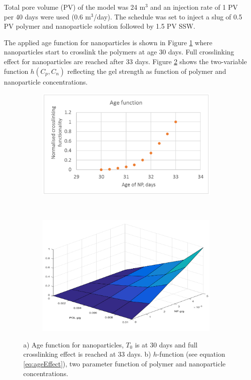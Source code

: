 \documentclass[journal = enfuem, manuscript =  article]{achemso}
\begin{document}
Total pore volume (PV) of the model was 24 m$^3$ and an injection rate of 1 PV per 40 days were used (0.6 m$^3$/day). The schedule was set to inject a slug of 0.5 PV polymer and nanoparticle solution followed by 1.5 PV SSW. 

The applied age function for nanoparticles is shown in Figure \ref{cht:ageFunc} where nanoparticles start to crosslink the polymers at age 30 days. Full crosslinking effect for nanoparticles are reached after 33 days. Figure \ref{cht:hFunc} shows the two-variable function $h(C_p,C_n)$  reflecting the gel strength as function of polymer and nanoparticle concentrations.      

\begin{figure}[h] %
    \begin{subfigure}{.5\textwidth}
    \centering
    \includegraphics[width=\textwidth]{fig/ageFunc.png}
    \caption{}
    \label{cht:ageFunc}
    \end{subfigure}
    \\
    \begin{subfigure}{.5\textwidth}
    \centering
    \includegraphics[width=\textwidth]{fig/hFunc.png}
    \caption{}
    \label{cht:hFunc}
    \end{subfigure}
    
    \caption{a) Age function for nanoparticles, $T_0$ is at 30 days and full crosslinking effect is reached at 33 days. b) $h$-function (see equation \ref{eq:ageEffect}), two parameter function of polymer and nanoparticle concentrations. }
    \label{cht:ageAndH}
\end{figure}
\end{document}
